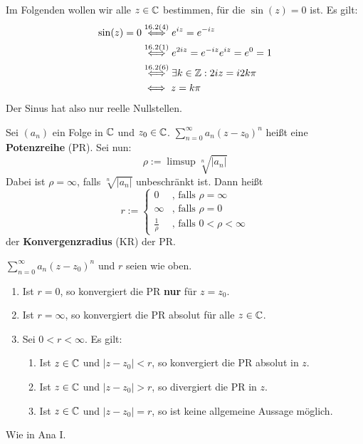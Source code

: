 \documentclass[a4paper,twoside,DIV15,BCOR12mm,chapterprefix=true,headings=twolinechapter]{scrbook}
\begin{document}
\begin{beispiel}
Im Folgenden wollen wir alle $z\in\mathbb{C}$ bestimmen, für die $\sin(z)=0$ ist. Es gilt:
\begin{align*}
\sin(z)=0 &\stackrel{16.2(4)}{\iff}e^{iz}=e^{-iz}\\
&\stackrel{16.2(1)}{\iff}e^{2iz}=e^{-iz}e^{iz}=e^0=1\\
&\stackrel{16.2(6)}{\iff}\exists k\in\mathbb{Z}: 2iz=i2k\pi\\
&\iff z=k\pi
\end{align*}
Der Sinus hat also nur reelle Nullstellen.
\end{beispiel}

\begin{definition}
Sei $(a_n)$ ein Folge in $\mathbb{C}$ und $z_0\in\mathbb{C}$. $\sum_{n=0}^\infty a_n(z-z_0)^n$
heißt eine \textbf{Potenzreihe} (PR). Sei nun:
\[\rho:=\limsup \sqrt[n]{|a_n|}\]
Dabei ist $\rho=\infty$, falls $\sqrt[n]{|a_n|}$ unbeschränkt ist. Dann heißt
\[r:=
\begin{cases}
0&\text{, falls }\rho=\infty\\
\infty&\text{, falls }\rho=0\\
\frac1\rho&\text{, falls }0<\rho<\infty
\end{cases}\]
der \textbf{Konvergenzradius} (KR) der PR.
\end{definition}

\begin{satz}
$\sum_{n=0}^\infty a_n(z-z_0)^n$ und $r$ seien wie oben.
\begin{enumerate}
\item Ist $r=0$, so konvergiert die PR \textbf{nur} für $z=z_0$.
\item Ist $r=\infty$, so konvergiert die PR absolut für alle $z\in\mathbb{C}$.
\item Sei $0<r<\infty$. Es gilt:
\begin{enumerate}
\item Ist $z\in\mathbb{C}$ und $|z-z_0|<r$, so konvergiert die PR absolut in $z$.
\item Ist $z\in\mathbb{C}$ und $|z-z_0|>r$, so divergiert die PR in $z$.
\item Ist $z\in\mathbb{C}$ und $|z-z_0|=r$, so ist keine allgemeine Aussage möglich.
\end{enumerate}
\end{enumerate}
\end{satz}

\begin{beweis}
Wie in Ana I.
\end{beweis}
\end{document}
